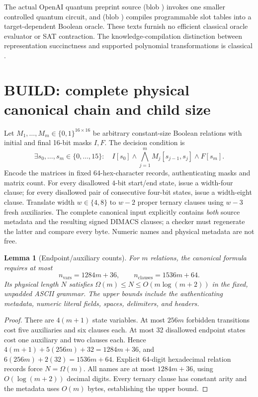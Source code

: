 \documentclass[11pt]{article}
\newtheorem{lemma}[theorem]{Lemma}
\begin{document}
The actual OpenAI quantum preprint source  (blob ) invokes one smaller controlled quantum circuit, and  (blob ) compiles programmable slot tables into a target-dependent Boolean oracle. These texts furnish no efficient classical oracle evaluator or SAT contraction. The knowledge-compilation distinction between representation succinctness and supported polynomial transformations is classical \cite{darwiche}.

\section{BUILD: complete physical canonical chain and child size}
Let $M_1,\ldots,M_m\in\{0,1\}^{16\times16}$ be arbitrary constant-size Boolean relations with initial and final 16-bit masks $I,F$. The decision condition is
\[
\exists s_0,\ldots,s_m\in\{0,\ldots,15\}:\quad I[s_0]\wedge \bigwedge_{j=1}^m M_j[s_{j-1},s_j]\wedge F[s_m].
\]
Encode the matrices in fixed 64-hex-character records, authenticating masks and matrix count. For every disallowed $4$-bit start/end state, issue a width-four clause; for every disallowed pair of consecutive four-bit states, issue a width-eight clause. Translate width $w\in\{4,8\}$ to $w-2$ proper ternary clauses using $w-3$ fresh auxiliaries. The complete canonical input explicitly contains \emph{both} source metadata and the resulting signed DIMACS clauses; a checker must regenerate the latter and compare every byte. Numeric names and physical metadata are not free.

\begin{lemma}[Endpoint/auxiliary counts]
For $m$ relations, the canonical formula requires at most
\[
 n_{\mathrm{vars}}=1284m+36,\qquad n_{\mathrm{clauses}}=1536m+64.
\]
Its physical length $N$ satisfies $\Omega(m)\le N\le O(m\log(m+2))$ in the fixed, unpadded ASCII grammar. The upper bounds include the authenticating metadata, numeric literal fields, spaces, delimiters, and headers.
\end{lemma}
\begin{proof}
There are $4(m+1)$ state variables. At most $256m$ forbidden transitions cost five auxiliaries and six clauses each. At most 32 disallowed endpoint states cost one auxiliary and two clauses each. Hence $4(m+1)+5(256m)+32=1284m+36$, and $6(256m)+2(32)=1536m+64$. Explicit 64-digit hexadecimal relation records force $N=\Omega(m)$. All names are at most $1284m+36$, using $O(\log(m+2))$ decimal digits. Every ternary clause has constant arity and the metadata uses $O(m)$ bytes, establishing the upper bound.
\end{proof}
\end{document}
